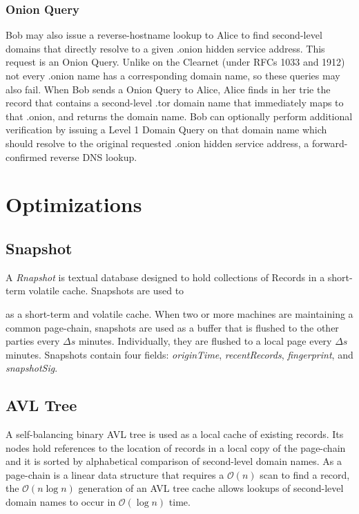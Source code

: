 \subsubsection{Onion Query}
\label{sec:OnionQuery}

Bob may also issue a reverse-hostname lookup to Alice to find second-level domains that directly resolve to a given .onion hidden service address. This request is an Onion Query. Unlike on the Clearnet (under RFCs 1033 and 1912) not every .onion name has a corresponding domain name, so these queries may also fail. When Bob sends a Onion Query to Alice, Alice finds in her trie the record that contains a second-level .tor domain name that immediately maps to that .onion, and returns the domain name. Bob can optionally perform additional verification by issuing a Level 1 Domain Query on that domain name which should resolve to the original requested .onion hidden service address, a forward-confirmed reverse DNS lookup.







\section{Optimizations}

\subsection{Snapshot}
		A \emph{Rnapshot} is textual database designed to hold collections of Records in a short-term volatile cache. Snapshots are used to 
		
		
		as a short-term and volatile cache. When two or more machines are maintaining a common page-chain, snapshots are used as a buffer that is flushed to the other parties every $ \Delta s $ minutes. Individually, they are flushed to a local page every $ \Delta s $ minutes. Snapshots contain four fields: \emph{originTime}, \emph{recentRecords}, \emph{fingerprint}, and \emph{snapshotSig}.

\subsection{AVL Tree}
\label{sec:AVLTree}

A self-balancing binary AVL tree is used as a local cache of existing records. Its nodes hold references to the location of records in a local copy of the page-chain and it is sorted by alphabetical comparison of second-level domain names. As a page-chain is a linear data structure that requires a $ \mathcal{O}(n) $ scan to find a record, the $ \mathcal{O}(n\log{}n) $ generation of an AVL tree cache allows lookups of second-level domain names to occur in $ \mathcal{O}(\log{}n) $ time.

